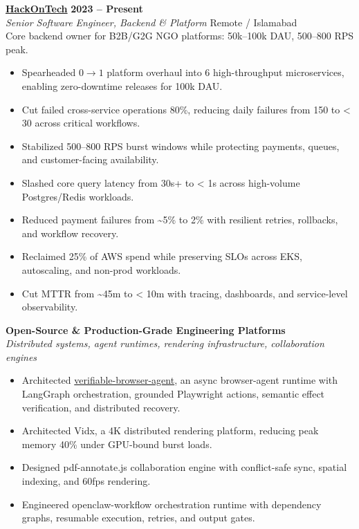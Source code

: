\documentclass[10pt,letterpaper]{article}
\newcommand{\zeroone}{\ensuremath{0\rightarrow1}}
\begin{document}
\textbf{\href{https://hackontech.com/}{HackOnTech}} \hfill \textbf{2023 -- Present}\\
\textit{Senior Software Engineer, Backend \& Platform} \hfill Remote / Islamabad\\
{\footnotesize Core backend owner for B2B/G2G NGO platforms: 50k--100k DAU, 500--800 RPS peak.}

\begin{itemize}
  \item Spearheaded \zeroone{} platform overhaul into 6 high-throughput microservices, enabling zero-downtime releases for 100k DAU.
  \item Cut failed cross-service operations 80\%, reducing daily failures from 150 to \textless{} 30 across critical workflows.
  \item Stabilized 500--800 RPS burst windows while protecting payments, queues, and customer-facing availability.
  \item Slashed core query latency from 30s+ to \textless{} 1s across high-volume Postgres/Redis workloads.
  \item Reduced payment failures from \textasciitilde{}5\% to 2\% with resilient retries, rollbacks, and workflow recovery.
  \item Reclaimed 25\% of AWS spend while preserving SLOs across EKS, autoscaling, and non-prod workloads.
  \item Cut MTTR from \textasciitilde{}45m to \textless{} 10m with tracing, dashboards, and service-level observability.
\end{itemize}

\vspace{4pt}

\vfill

\textbf{Open-Source \& Production-Grade Engineering Platforms}\\
\textit{Distributed systems, agent runtimes, rendering infrastructure, collaboration engines}

\begin{itemize}
  \item Architected \href{https://github.com/adnahmed/verifiable-browser-agent}{verifiable-browser-agent}, an async browser-agent runtime with LangGraph orchestration, grounded Playwright actions, semantic effect verification, and distributed recovery.
  \item Architected Vidx, a 4K distributed rendering platform, reducing peak memory 40\% under GPU-bound burst loads.
  \item Designed pdf-annotate.js collaboration engine with conflict-safe sync, spatial indexing, and 60fps rendering.
  \item Engineered openclaw-workflow orchestration runtime with dependency graphs, resumable execution, retries, and output gates.
\end{itemize}
\end{document}
